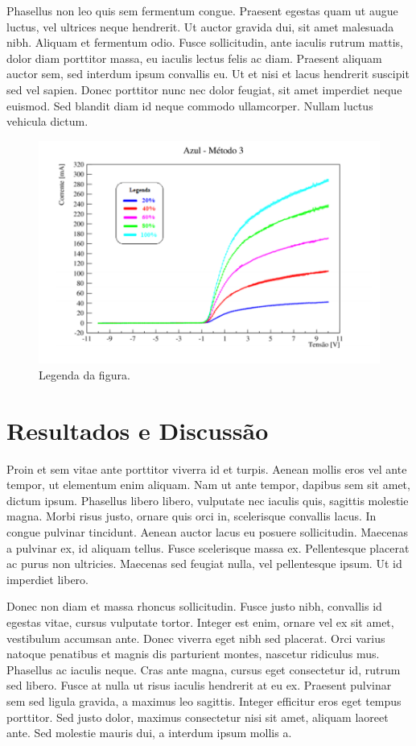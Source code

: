 \documentclass[twoside]{article}
\begin{document}
\begin{multicols}{2}
  Phasellus non leo quis sem fermentum congue. Praesent egestas quam ut augue luctus, vel ultrices neque hendrerit. Ut auctor gravida dui, sit amet malesuada nibh. Aliquam et fermentum odio. Fusce sollicitudin, ante iaculis rutrum mattis, dolor diam porttitor massa, eu iaculis lectus felis ac diam. Praesent aliquam auctor sem, sed interdum ipsum convallis eu. Ut et nisi et lacus hendrerit suscipit sed vel sapien. Donec porttitor nunc nec dolor feugiat, sit amet imperdiet neque euismod. Sed blandit diam id neque commodo ullamcorper. Nullam luctus vehicula dictum.

  \begin{figure}[H]
    \centering
    \includegraphics[scale=0.75]{figurateste.png}
    \caption{Legenda da figura.}
    \label{fig}
  \end{figure}


  \section{Resultados e Discussão}


  Proin et sem vitae ante porttitor viverra id et turpis. Aenean mollis eros vel ante tempor, ut elementum enim aliquam. Nam ut ante tempor, dapibus sem sit amet, dictum ipsum. Phasellus libero libero, vulputate nec iaculis quis, sagittis molestie magna. Morbi risus justo, ornare quis orci in, scelerisque convallis lacus. In congue pulvinar tincidunt. Aenean auctor lacus eu posuere sollicitudin. Maecenas a pulvinar ex, id aliquam tellus. Fusce scelerisque massa ex. Pellentesque placerat ac purus non ultricies. Maecenas sed feugiat nulla, vel pellentesque ipsum. Ut id imperdiet libero.


  Donec non diam et massa rhoncus sollicitudin. Fusce justo nibh, convallis id egestas vitae, cursus vulputate tortor. Integer est enim, ornare vel ex sit amet, vestibulum accumsan ante. Donec viverra eget nibh sed placerat. Orci varius natoque penatibus et magnis dis parturient montes, nascetur ridiculus mus. Phasellus ac iaculis neque. Cras ante magna, cursus eget consectetur id, rutrum sed libero. Fusce at nulla ut risus iaculis hendrerit at eu ex. Praesent pulvinar sem sed ligula gravida, a maximus leo sagittis. Integer efficitur eros eget tempus porttitor. Sed justo dolor, maximus consectetur nisi sit amet, aliquam laoreet ante. Sed molestie mauris dui, a interdum ipsum mollis a.


\end{multicols}
\end{document}
